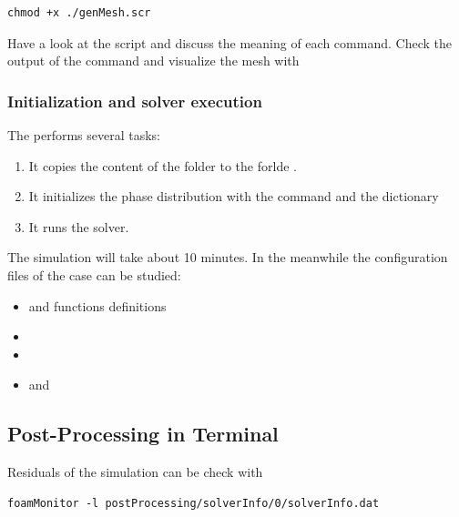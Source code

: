 \documentclass[
    parskip=half,      %
    DIV=12,            %
    headings=normal,   %
    fontsize=11pt,     %
    english            %
]{scrartcl}
\begin{document}
\begin{lstlisting}[style=terminal]
chmod +x ./genMesh.scr
\end{lstlisting}

Have a look at the script and discuss the meaning of each command. Check the output
of the  command and 
visualize the mesh with 

\subsubsection{Initialization and solver execution}

The  performs several tasks:

\begin{enumerate}
	\item It copies the content of the folder  to the forlde 
	.
	\item It initializes the phase distribution with the command 
	 and the dictionary 
	\item It runs the  solver. 
\end{enumerate}

The simulation will take about 10 minutes. In the meanwhile the configuration files of
the case can be studied:

\begin{itemize}
	\item {} and functions definitions
	\item {}
	\item {}
	\item {} and 
\end{itemize}




\subsection{Post-Processing in Terminal}

Residuals of the simulation can be check with

\begin{lstlisting}[style=terminal]
foamMonitor -l postProcessing/solverInfo/0/solverInfo.dat
\end{lstlisting}
\end{document}
